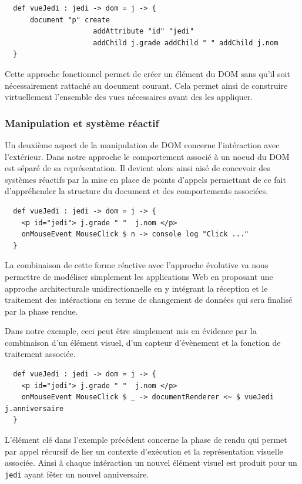 \documentclass[twoside,a4paper]{article}
\begin{document}
\begin{lstlisting}
  def vueJedi : jedi -> dom = j -> {
      document "p" create 
                     addAttribute "id" "jedi" 
                     addChild j.grade addChild " " addChild j.nom
  }
\end{lstlisting}

Cette  approche fonctionnel  permet de  créer un  élément du  DOM sans
qu'il soit  nécessairement rattaché au document  courant.  Cela permet
ainsi  de construire  virtuellement  l'ensemble  des vues  nécessaires
avant des les appliquer.

\subsubsection{Manipulation et système réactif}

Un deuxième  aspect de la  manipulation de DOM  concerne l'intéraction
avec l'extérieur.   Dans notre approche  le comportement associé  à un
noeud du DOM est séparé de  sa représentation.  Il devient alors ainsi
aisé de concevoir des systèmes réactifs par la mise en place de points
d'appels permettant de ce fait  d'appréhender la structure du document
et des comportements associées.

\begin{lstlisting}
  def vueJedi : jedi -> dom = j -> {
    <p id="jedi"> j.grade " "  j.nom </p> 
    onMouseEvent MouseClick $ n -> console log "Click ..."
  }
\end{lstlisting}

La combinaison  de cette forme  réactive avec l'approche  évolutive va
nous  permettre  de  modéliser  simplement  les  applications  Web  en
proposant     une     approche    architecturale     unidirectionnelle
\cite{unidirectionnal} en  y intégrant  la réception et  le traitement
des intéractions en  terme de changement de données  qui sera finalisé
par la phase rendue.
 
Dans notre exemple,  ceci peut être simplement mis en  évidence par la
combinaison  d'un  élément  visuel,  d'un capteur  d'évènement  et  la 
fonction de traitement associée.

\begin{lstlisting}
  def vueJedi : jedi -> dom = j -> {
    <p id="jedi"> j.grade " "  j.nom </p> 
    onMouseEvent MouseClick $ _ -> documentRenderer <~ $ vueJedi j.anniversaire
  }
\end{lstlisting}

L'élément clé dans l'exemple précédent  concerne la phase de rendu qui
permet  par appel  récursif  de  lier un  contexte  d'exécution et  la
représentation  visuelle  associée.   Ainsi à  chaque  intéraction  un
nouvel élément  visuel est produit pour  un {\tt jedi} ayant  fêter un
nouvel anniversaire.
\end{document}
